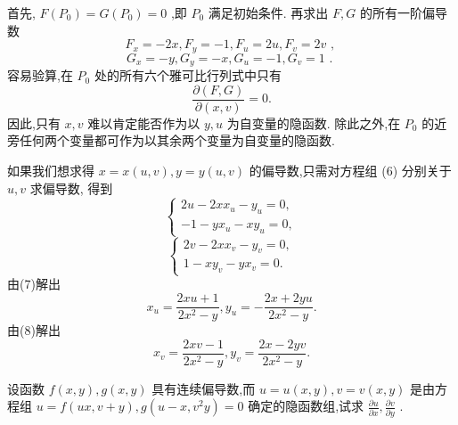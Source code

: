 \begin{solution}

\end{solution}
首先, \(F\left( {P}_{0}\right)  = G\left( {P}_{0}\right)  = 0\) ,即 \({P}_{0}\) 满足初始条件. 再求出 \(F,G\) 的所有一阶偏导数
\[
{F}_{x} =  - {2x},{F}_{y} =  - 1,{F}_{u} = {2u},{F}_{v} = {2v}\text{ , }
\]
\[
{G}_{x} =  - y,{G}_{y} =  - x,{G}_{u} =  - 1,{G}_{v} = 1\text{ . }
\]
容易验算,在 \({P}_{0}\) 处的所有六个雅可比行列式中只有
\[
\frac{\partial \left( {F,G}\right) }{\partial \left( {x,v}\right) } = 0.
\]
因此,只有 \(x,v\) 难以肯定能否作为以 \(y,u\) 为自变量的隐函数. 除此之外,在 \({P}_{0}\) 的近旁任何两个变量都可作为以其余两个变量为自变量的隐函数.

如果我们想求得 \(x = x\left( {u,v}\right) ,y = y\left( {u,v}\right)\) 的偏导数,只需对方程组 (6) 分别关于 \(u,v\) 求偏导数, 得到
\[
\left\{  \begin{array}{l} {2u} - {2x}{x}_{u} - {y}_{u} = 0, \\   - 1 - y{x}_{u} - x{y}_{u} = 0, \end{array}\right.  \tag{7}
\]
\[
\left\{  \begin{array}{l} {2v} - {2x}{x}_{v} - {y}_{v} = 0, \\  1 - x{y}_{v} - y{x}_{v} = 0. \end{array}\right.  \tag{8}
\]
由(7)解出
\[
{x}_{u} = \frac{{2xu} + 1}{2{x}^{2} - y},{y}_{u} =  - \frac{{2x} + {2yu}}{2{x}^{2} - y}.
\]
由(8)解出
\[
{x}_{v} = \frac{{2xv} - 1}{2{x}^{2} - y},{y}_{v} = \frac{{2x} - {2yv}}{2{x}^{2} - y}.
\]
\begin{example}

\end{example}
设函数 \(f\left( {x,y}\right) ,g\left( {x,y}\right)\) 具有连续偏导数,而 \(u = u\left( {x,y}\right) ,v = v\left( {x,y}\right)\) 是由方程组 \(u = f\left( {{ux},v + y}\right) ,g\left( {u - x,{v}^{2}y}\right)  = 0\) 确定的隐函数组,试求 \(\frac{\partial u}{\partial x},\frac{\partial v}{\partial y}\) .


